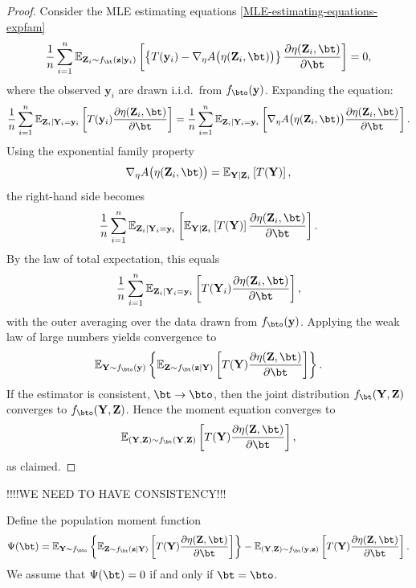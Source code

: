 \begin{proof}
Consider the MLE estimating equations \eqref{MLE-estimating-equations-expfam}
\[
\frac{1}{n} \sum_{i=1}^n 
\mathbb{E}_{\mathbf{Z}_i \sim f_\bt(\mathbf{z} \mid \mathbf{y}_i)} \left[
    \left\{ T(\mathbf{y}_i) - \nabla_\eta A\bigl( \eta(\mathbf{Z}_i, \bt) \bigr) \right\}
    \frac{\partial \eta(\mathbf{Z}_i, \bt)}{\partial \bt}
\right]
= 0,
\]
where the observed $\mathbf{y}_i$ are drawn i.i.d.\ from $f_{\bto}(\mathbf{y})$. Expanding the equation:
\[
\frac{1}{n} \sum_{i=1}^n 
\mathbb{E}_{\mathbf{Z}_i \mid \mathbf{Y}_i = \mathbf{y}_i}
\left[
    T(\mathbf{y}_i)
    \frac{\partial \eta(\mathbf{Z}_i, \bt)}{\partial \bt}
\right]
=
\frac{1}{n} \sum_{i=1}^n 
\mathbb{E}_{\mathbf{Z}_i \mid \mathbf{Y}_i = \mathbf{y}_i}
\left[
    \nabla_\eta A\bigl( \eta(\mathbf{Z}_i, \bt) \bigr)
    \frac{\partial \eta(\mathbf{Z}_i, \bt)}{\partial \bt}
\right].
\]
Using the exponential family property
\[
\nabla_\eta A\bigl( \eta(\mathbf{Z}_i, \bt) \bigr)
= \mathbb{E}_{\mathbf{Y} \mid \mathbf{Z}_i} \left[ T(\mathbf{Y}) \right],
\]
the right-hand side becomes
\[
\frac{1}{n} \sum_{i=1}^n 
\mathbb{E}_{\mathbf{Z}_i \mid \mathbf{Y}_i = \mathbf{y}_i}
\left[
    \mathbb{E}_{\mathbf{Y} \mid \mathbf{Z}_i}
    \left[ T(\mathbf{Y}) \right]
    \frac{\partial \eta(\mathbf{Z}_i, \bt)}{\partial \bt}
\right].
\]
By the law of total expectation, this equals
\[
\frac{1}{n} \sum_{i=1}^n 
\mathbb{E}_{\mathbf{Z}_i \mid \mathbf{Y}_i = \mathbf{y}_i}
\left[
    T(\mathbf{Y}_i)
    \frac{\partial \eta(\mathbf{Z}_i, \bt)}{\partial \bt}
\right],
\]
with the outer averaging over the data drawn from $f_{\bto}(\mathbf{y})$. Applying the weak law of large numbers yields convergence to
\[
\mathbb{E}_{\mathbf{Y} \sim f_{\bto}(\mathbf{y})}
\left\{
\mathbb{E}_{\mathbf{Z} \sim f_\bt(\mathbf{z} \mid \mathbf{Y})}
\left[
    T(\mathbf{Y})
    \frac{\partial \eta(\mathbf{Z}, \bt)}{\partial \bt}
\right]
\right\}.
\]
If the estimator is consistent, $\bt \to \bto$, then the joint distribution $f_\bt(\mathbf{Y}, \mathbf{Z})$ converges to $f_{\bto}(\mathbf{Y}, \mathbf{Z})$. Hence the moment equation converges to
\[
\mathbb{E}_{(\mathbf{Y}, \mathbf{Z}) \sim f_\bt(\mathbf{Y}, \mathbf{Z})}
\left[
    T(\mathbf{Y})
    \frac{\partial \eta(\mathbf{Z}, \bt)}{\partial \bt}
\right],
\]
as claimed.
\end{proof}

!!!!WE NEED TO HAVE CONSISTENCY!!!

\begin{assumption}[Identification]
Define the population moment function
\[
\Psi(\bt)
=
\mathbb{E}_{\mathbf{Y} \sim f_{\bto}} \left\{
    \mathbb{E}_{\mathbf{Z} \sim f_\bt(\mathbf{z} \mid \mathbf{Y})}
    \left[
        T(\mathbf{Y}) \frac{\partial \eta(\mathbf{Z}, \bt)}{\partial \bt}
    \right]
\right\}
-
\mathbb{E}_{(\mathbf{Y}, \mathbf{Z}) \sim f_\bt(\mathbf{y}, \mathbf{z})}
\left[
    T(\mathbf{Y}) \frac{\partial \eta(\mathbf{Z}, \bt)}{\partial \bt}
\right].
\]
We assume that $\Psi(\bt) = 0$ if and only if $\bt = \bto$.
\end{assumption}



